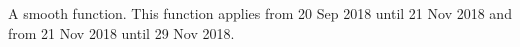 A smooth function. This function applies from 20 Sep 2018 until 21 Nov 2018 and from 21 Nov 2018 until 29 Nov 2018.